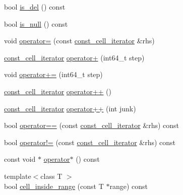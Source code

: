 \begin{DoxyCompactItemize}
\item 
bool \hyperlink{classTile_1_1const__cell__iterator_adead9b9ee2e87ce369d59ef0a238c579}{is\+\_\+del} () const 
\item 
bool \hyperlink{classTile_1_1const__cell__iterator_a5d4a12970dda025982daadda14b68d84}{is\+\_\+null} () const 
\item 
void \hyperlink{classTile_1_1const__cell__iterator_a6122d4937aec3b410b8266db67510092}{operator=} (const \hyperlink{classTile_1_1const__cell__iterator}{const\+\_\+cell\+\_\+iterator} \&rhs)
\item 
\hyperlink{classTile_1_1const__cell__iterator}{const\+\_\+cell\+\_\+iterator} \hyperlink{classTile_1_1const__cell__iterator_a79be7ade4f88950b0b1aaf93cb59614f}{operator+} (int64\+\_\+t step)
\item 
void \hyperlink{classTile_1_1const__cell__iterator_ab03e17f292568094c0200b0f602140e6}{operator+=} (int64\+\_\+t step)
\item 
\hyperlink{classTile_1_1const__cell__iterator}{const\+\_\+cell\+\_\+iterator} \hyperlink{classTile_1_1const__cell__iterator_a1a1c4596322fd4edbeb8fd52e97238a9}{operator++} ()
\item 
\hyperlink{classTile_1_1const__cell__iterator}{const\+\_\+cell\+\_\+iterator} \hyperlink{classTile_1_1const__cell__iterator_a7ce5ef1362668d794776c25f70cb9fb2}{operator++} (int junk)
\item 
bool \hyperlink{classTile_1_1const__cell__iterator_a36fe2da14617c82b8b746b12a5d67ba7}{operator==} (const \hyperlink{classTile_1_1const__cell__iterator}{const\+\_\+cell\+\_\+iterator} \&rhs) const 
\item 
bool \hyperlink{classTile_1_1const__cell__iterator_aa6e3d465717dd4136af9ed7627539715}{operator!=} (const \hyperlink{classTile_1_1const__cell__iterator}{const\+\_\+cell\+\_\+iterator} \&rhs) const 
\item 
const void $\ast$ \hyperlink{classTile_1_1const__cell__iterator_a51cfd339a7f157a3b4b913e8f2120a87}{operator$\ast$} () const 
\item 
{\footnotesize template$<$class T $>$ }\\bool \hyperlink{classTile_1_1const__cell__iterator_ac293f63b9c0aeec9b737695de55bc397}{cell\+\_\+inside\+\_\+range} (const T $\ast$range) const 
\end{DoxyCompactItemize}
